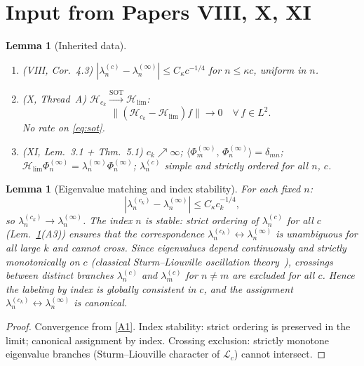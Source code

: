 \documentclass[12pt,a4paper]{amsart}
\newtheorem{lemma}[theorem]{Lemma}
\theoremstyle{definition}
\theoremstyle{remark}
\newcommand{\ip}[2]{\langle #1,\, #2\rangle}
\newcommand{\Hlim}{\mathcal{H}_{\lim}}
\begin{document}
\tableofcontents

\section{Input from Papers VIII, X, XI}
\label{sec:input}

\begin{lemma}[Inherited data]
\label{lem:inherited}
\begin{enumerate}[\rm(A)]
\item\label{A1}
  \emph{(VIII, Cor.~4.3)}
  $|\lambda_n^{(c)}-\lambda_n^{(\infty)}|
  \le C_\kappa c^{-1/4}$
  for $n\le\kappa c$, uniform in $n$.
\item\label{A2}
  \emph{(X, Thread~A)}
  $\mathcal{H}_{c_k}
  \xrightarrow{\mathrm{SOT}}\Hlim$:
  \begin{equation}\label{eq:sot}
    \|(\mathcal{H}_{c_k}-\Hlim)f\|
    \to 0 \quad\forall\, f\in L^2.
  \end{equation}
  No rate on \eqref{eq:sot}.
\item\label{A3}
  \emph{(XI, Lem.~3.1 + Thm.~5.1)}
  $c_k\nearrow\infty$;
  $\ip{\Phi_m^{(\infty)}}
  {\Phi_n^{(\infty)}}=\delta_{mn}$;
  $\Hlim\Phi_n^{(\infty)}
  =\lambda_n^{(\infty)}\Phi_n^{(\infty)}$;
  $\lambda_n^{(c)}$ simple and strictly
  ordered for all $n$, $c$.
\end{enumerate}
\end{lemma}

\begin{lemma}[Eigenvalue matching
  and index stability]
\label{lem:eigenvalue-matching}
For each fixed $n$:
\[
  |\lambda_n^{(c_k)}
  -\lambda_n^{(\infty)}|
  \le C_\kappa c_k^{-1/4},
\]
so $\lambda_n^{(c_k)}
\to\lambda_n^{(\infty)}$.
The index $n$ is stable: strict ordering
of $\lambda_n^{(c)}$ for all $c$
(Lem.~\ref{lem:inherited}(A3)) ensures
that the correspondence
$\lambda_n^{(c_k)}
\leftrightarrow\lambda_n^{(\infty)}$
is unambiguous for all large $k$
and cannot cross.
Since eigenvalues depend continuously
and strictly monotonically on $c$
(classical Sturm--Liouville oscillation
theory~\cite[Sec.~3.2]{Osipov2013}),
crossings between distinct branches
$\lambda_n^{(c)}$ and
$\lambda_m^{(c)}$ for $n\ne m$
are excluded for all $c$.
Hence the labeling by index is globally
consistent in $c$, and the assignment
$\lambda_n^{(c_k)}\leftrightarrow
\lambda_n^{(\infty)}$ is canonical.
\end{lemma}
\begin{proof}
Convergence from \eqref{A1}.
Index stability: strict ordering is
preserved in the limit; canonical
assignment by index.
Crossing exclusion: strictly monotone
eigenvalue branches
(Sturm--Liouville character of
$\mathcal{L}_c$) cannot intersect.
\end{proof}
\end{document}
